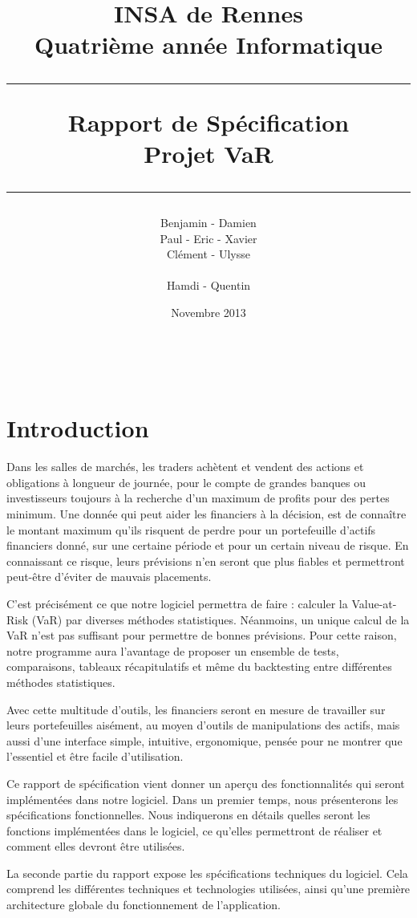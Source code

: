 \documentclass[a4paper]{report}
\title{INSA de Rennes \\ Quatrième année Informatique \\ \bigskip \hrule \bigskip Rapport de Spécification \\ \bigskip Projet VaR \bigskip \hrule}
\author{Benjamin \bsc{Bouguet} - Damien \bsc{Carduner} \\Paul \bsc{Chaignon} - Eric \bsc{Chauty} - Xavier \bsc{Fraboulet} \\ Clément \bsc{Gautrais} - Ulysse \bsc{Goarant} \\ ~~\\
Hamdi \bsc{Raissi} - Quentin \bsc{Giai Gianetto}}
\date{Novembre 2013}
\begin{document}
\maketitle

\thispagestyle{empty}
\newpage

~~
\thispagestyle{empty}
\newpage


\tableofcontents
\newpage


\chapter{Introduction}

Dans les salles de marchés, les traders achètent et vendent des actions et  obligations à longueur de journée, pour le compte de grandes banques ou investisseurs toujours à la recherche d’un maximum de profits pour des pertes minimum.
Une donnée qui peut aider les financiers à la décision, est de connaître le montant maximum qu’ils risquent de perdre pour un portefeuille d’actifs financiers donné, sur une certaine période et pour un certain niveau de risque.
En connaissant ce risque, leurs prévisions n'en seront que plus fiables et permettront peut-être d’éviter de mauvais placements. 

C’est précisément ce que notre logiciel permettra de faire : calculer la Value-at-Risk (VaR) par diverses méthodes statistiques.
Néanmoins, un unique calcul de la VaR n’est pas suffisant pour permettre de bonnes prévisions.
Pour cette raison, notre programme aura l’avantage de proposer un ensemble de tests, comparaisons, tableaux récapitulatifs et même du backtesting entre différentes méthodes statistiques.


Avec cette multitude d'outils, les financiers seront en mesure de travailler sur leurs portefeuilles aisément, au moyen d’outils de manipulations des actifs, mais aussi d’une interface simple, intuitive, ergonomique, pensée pour ne montrer que l’essentiel et être facile d’utilisation.


Ce rapport de spécification vient donner un aperçu des fonctionnalités qui seront implémentées dans notre logiciel.
Dans un premier temps, nous présenterons les spécifications fonctionnelles.
Nous indiquerons en détails quelles seront les fonctions implémentées dans le logiciel, ce qu’elles permettront de réaliser et comment elles devront être utilisées.

La seconde partie du rapport expose les spécifications techniques du logiciel.
Cela comprend les différentes techniques et technologies utilisées, ainsi qu'une première architecture globale du fonctionnement de l’application.
\end{document}
